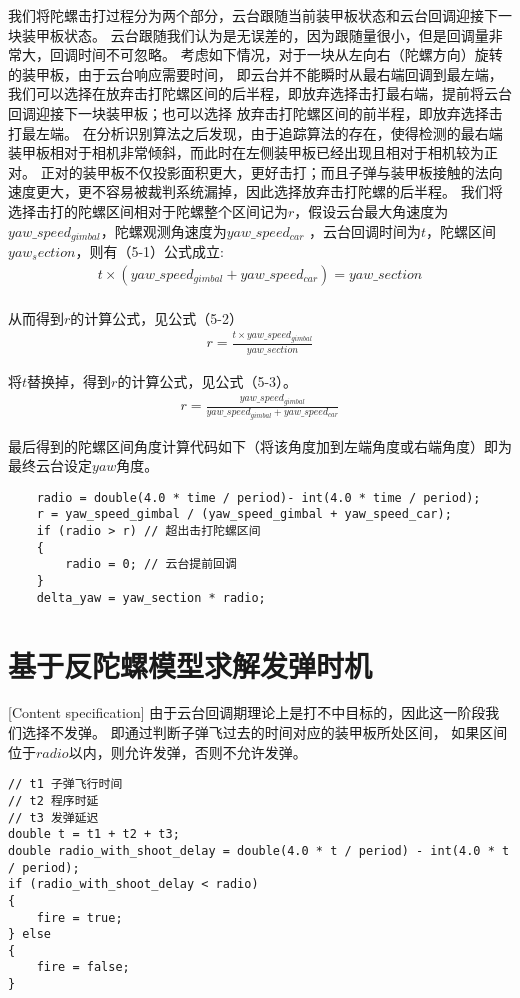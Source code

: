 我们将陀螺击打过程分为两个部分，云台跟随当前装甲板状态和云台回调迎接下一块装甲板状态。
云台跟随我们认为是无误差的，因为跟随量很小，但是回调量非常大，回调时间不可忽略。
考虑如下情况，对于一块从左向右（陀螺方向）旋转的装甲板，由于云台响应需要时间，
即云台并不能瞬时从最右端回调到最左端，
我们可以选择在放弃击打陀螺区间的后半程，即放弃选择击打最右端，提前将云台回调迎接下一块装甲板；也可以选择
放弃击打陀螺区间的前半程，即放弃选择击打最左端。
在分析识别算法之后发现，由于追踪算法的存在，使得检测的最右端装甲板相对于相机非常倾斜，而此时在左侧装甲板已经出现且相对于相机较为正对。
正对的装甲板不仅投影面积更大，更好击打；而且子弹与装甲板接触的法向速度更大，更不容易被裁判系统漏掉，因此选择放弃击打陀螺的后半程。
我们将选择击打的陀螺区间相对于陀螺整个区间记为$r$，假设云台最大角速度为$yaw\_speed_{gimbal}$，陀螺观测角速度为$yaw\_speed_{car}$
，云台回调时间为$t$，陀螺区间$yaw_section$，则有（5-1）公式成立:
\begin{gather}
    t  \times (yaw\_speed_{gimbal} + yaw\_speed_{car}) = yaw\_section \\
\end{gather}

从而得到$r$的计算公式，见公式（5-2）
\begin{gather}
r = \frac{t \times yaw\_speed_{gimbal} }{yaw\_section}
\end{gather}

将$t$替换掉，得到$r$的计算公式，见公式（5-3）。
\begin{gather}
    r = \frac{yaw\_speed_{gimbal}}{yaw\_speed_{gimbal} + yaw\_speed_{car}}
\end{gather}

最后得到的陀螺区间角度计算代码如下（将该角度加到左端角度或右端角度）即为最终云台设定$yaw$角度。
\begin{lstlisting}
    radio = double(4.0 * time / period)- int(4.0 * time / period);
    r = yaw_speed_gimbal / (yaw_speed_gimbal + yaw_speed_car);
    if (radio > r) // 超出击打陀螺区间
    {
        radio = 0; // 云台提前回调
    }
    delta_yaw = yaw_section * radio;
\end{lstlisting}

\section{基于反陀螺模型求解发弹时机}[Content specification]
由于云台回调期理论上是打不中目标的，因此这一阶段我们选择不发弹。
即通过判断子弹飞过去的时间对应的装甲板所处区间，
如果区间位于$radio$以内，则允许发弹，否则不允许发弹。
\begin{lstlisting}
// t1 子弹飞行时间
// t2 程序时延
// t3 发弹延迟
double t = t1 + t2 + t3;
double radio_with_shoot_delay = double(4.0 * t / period) - int(4.0 * t / period);
if (radio_with_shoot_delay < radio)
{
    fire = true;
} else
{
    fire = false;
}
\end{lstlisting}



